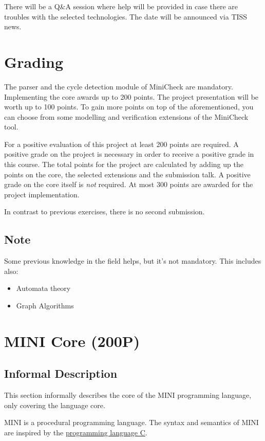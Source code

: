 \documentclass{article}
\begin{document}
There will be a Q\&A session where help will be provided in case there are troubles with the selected technologies. 
The date will be announced via TISS news.

\section{Grading}

The parser and the cycle detection module of MiniCheck are mandatory. 
Implementing the core awards up to 200 points. The project presentation will be worth up to 100 points. 
To gain more points on top of the aforementioned, you can choose from some modelling and verification extensions of the MiniCheck tool.

For a positive evaluation of this project at least 200 points are required. A positive grade on the project is necessary 
in order to receive a positive grade in this course. The total points for the project are calculated by adding up the points on the core, 
the selected extensions and the submission talk. A positive grade on the core itself is \textit{not} required. 
At most 300 points are awarded for the project implementation.

In contrast to previous exercises, there is no second submission.

\subsection{Note}
Some previous knowledge in the field helps, but it's not mandatory. This includes also:
\begin{itemize}
    \item Automata theory
    \item Graph Algorithms
\end{itemize}




\section{MINI Core (200P)}

\subsection{Informal Description}

This section informally describes the core of the MINI programming language, only covering the language core.

MINI is a procedural programming language. The syntax and semantics of MINI are inspired by the \href{https://en.wikipedia.org/wiki/C_(programming_language)}{programming language C}.
\end{document}
